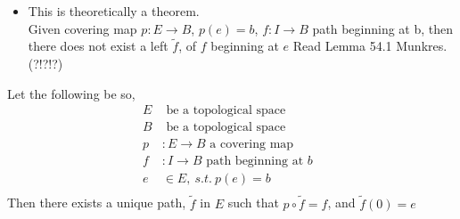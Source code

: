 \documentclass[../notes.tex]{subfiles}
\begin{document}
    \begin{itemize}
        \item 
            This is theoretically a theorem.\\
            Given covering map $p:E\rightarrow B$, $p(e)=b$,
            $f:I \rightarrow B$ path beginning at b, then there does not exist a left $\tilde{f}$,
            of $f$ beginning at $e$ Read Lemma 54.1 Munkres. (?!?!?)
    \end{itemize}
    \begin{theorem}
        Let the following be so,
        \begin{align*}
            E& \text{ be a topological space}\\
            B& \text{ be a topological space}\\
            p&:E \rightarrow B \text{ a covering map}\\
            f&:I \rightarrow B \text{ path beginning at $b$ }\\
            e &\in E,\ s.t.\ p(e)=b\\
        \end{align*}
        Then there exists a unique path, $\tilde{f}$ in $E$ such that $p\circ \tilde{f}=f$, and
        $\tilde{f}(0)=e$
    \end{theorem}
\end{document}
